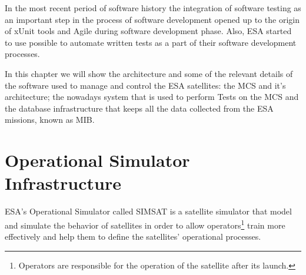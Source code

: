 In the most recent period of software history the integration of
software testing as an important step in the process of
software development opened up to the origin of xUnit\cite{xunit} tools and Agile during software development phase.
Also, \ac{ESA} started to use possible to automate written tests as a part of their
software development processes.\\


In this chapter we will show the architecture and some of the relevant details of the software used to manage and control
the \ac{ESA} satellites: the \ac{MCS} and it's architecture; the nowadays system that is used to perform Tests on the \ac{MCS} and the
database infrastructure that keeps all the data collected from the \ac{ESA} missions, known as \ac{MIB}.

\section{Operational Simulator Infrastructure}
\ac{ESA}'s Operational Simulator called \ac{SIMSAT}
is a satellite simulator that model and simulate
the behavior of satellites in order to allow operators\footnote{Operators are responsible for the operation of the satellite after its launch.} train more effectively 
and help them to define the satellites' operational processes.

